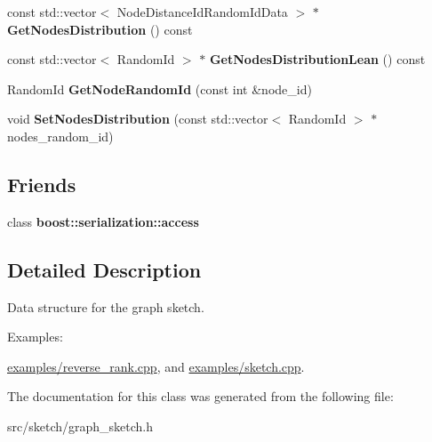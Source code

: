 \begin{DoxyCompactItemize}
\item 
\hypertarget{classall__distance__sketch_1_1GraphSketch_ae31e8b23fc7063927b2368a06bc57adb}{}const std\+::vector$<$ Node\+Distance\+Id\+Random\+Id\+Data $>$ $\ast$ {\bfseries Get\+Nodes\+Distribution} () const \label{classall__distance__sketch_1_1GraphSketch_ae31e8b23fc7063927b2368a06bc57adb}

\item 
\hypertarget{classall__distance__sketch_1_1GraphSketch_af463db872f2cc5cc635dffe4aaf136e6}{}const std\+::vector$<$ Random\+Id $>$ $\ast$ {\bfseries Get\+Nodes\+Distribution\+Lean} () const \label{classall__distance__sketch_1_1GraphSketch_af463db872f2cc5cc635dffe4aaf136e6}

\item 
\hypertarget{classall__distance__sketch_1_1GraphSketch_af9bbe3a02d29880b7218c52b53375e31}{}Random\+Id {\bfseries Get\+Node\+Random\+Id} (const int \&node\+\_\+id)\label{classall__distance__sketch_1_1GraphSketch_af9bbe3a02d29880b7218c52b53375e31}

\item 
\hypertarget{classall__distance__sketch_1_1GraphSketch_af57117f7a70b714dedc882d8f213207c}{}void {\bfseries Set\+Nodes\+Distribution} (const std\+::vector$<$ Random\+Id $>$ $\ast$nodes\+\_\+random\+\_\+id)\label{classall__distance__sketch_1_1GraphSketch_af57117f7a70b714dedc882d8f213207c}

\end{DoxyCompactItemize}
\subsection*{Friends}
\begin{DoxyCompactItemize}
\item 
\hypertarget{classall__distance__sketch_1_1GraphSketch_ac98d07dd8f7b70e16ccb9a01abf56b9c}{}class {\bfseries boost\+::serialization\+::access}\label{classall__distance__sketch_1_1GraphSketch_ac98d07dd8f7b70e16ccb9a01abf56b9c}

\end{DoxyCompactItemize}


\subsection{Detailed Description}
Data structure for the graph sketch. \begin{Desc}
\item[Examples\+: ]\par
\hyperlink{examples_2reverse_rank_8cpp-example}{examples/reverse\+\_\+rank.\+cpp}, and \hyperlink{examples_2sketch_8cpp-example}{examples/sketch.\+cpp}.\end{Desc}


The documentation for this class was generated from the following file\+:\begin{DoxyCompactItemize}
\item 
src/sketch/graph\+\_\+sketch.\+h\end{DoxyCompactItemize}

